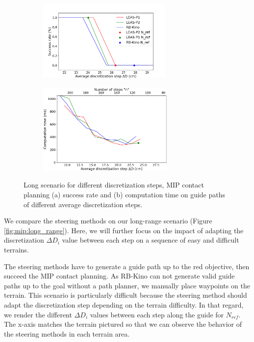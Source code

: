 \begin{figure}[t]
    \centering
    \captionsetup[subfigure]{justification=centering}
    \begin{subfigure}[t]{0.48\linewidth}
    \includegraphics[trim={0cm 0cm 1.9cm 1.6cm}, clip,width=\textwidth, height=4cm]{Figures/Chapter_MIP_SL1M/res_mip/MIP_res_long/FIGURE_MIP_LONG_2.png}
    \caption{}
    \label{fig:mip:long_range_success_time:success}
    \end{subfigure}
    \begin{subfigure}[t]{0.48\linewidth}
    \includegraphics[trim={0cm 0cm 0cm 0cm}, clip,width=\textwidth, height=4.5cm]{Figures/Chapter_MIP_SL1M/res_mip/time_long.png}
    \caption{}
    \label{fig:mip:long_range_success_time:time}
    \end{subfigure}
    \caption{Long scenario for different discretization steps, MIP contact planning (a) success rate and (b) computation time on guide paths of different average discretization steps.}
    \label{fig:mip:long_range_success_time}
\end{figure}

We compare the steering methods on our long-range scenario (Figure \ref{fig:mip:long_range}).
Here, we will further focus on the impact of adapting the discretization $\Delta D_i$ value between each step on a sequence of easy and difficult terrains.

The steering methods have to generate a guide path up to the red objective, then succeed the MIP contact planning.
As RB-Kino can not generate valid guide paths up to the goal without a path planner, we manually place waypoints on the terrain.
This scenario is particularly difficult because the steering method should adapt the discretization step depending on the terrain difficulty.
In that regard, we render the different $\Delta D_i$ values between each step along the guide for $N_{ref}$.
The x-axis matches the terrain pictured so that we can observe the behavior of the steering methods in each terrain area.

